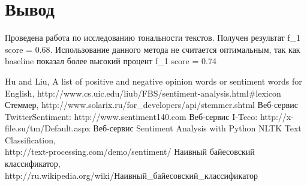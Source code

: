\documentclass[14pt,a4paper]{scrartcl}
\begin{document}
\newpage
\section{Вывод}

Проведена работа по исследованию тональности текстов. Получен результат f\_1 score = 0.68. Использование данного метода не считается оптимальным, так как baseline показал более высокий процент f\_1 score = 0.74

\newpage
\begin{thebibliography}{0}
 Hu and Liu, A list of positive and negative opinion words or sentiment words for English, http://www.cs.uic.edu/liub/FBS/sentiment-analysis.html\#lexicon
 Стеммер, http://www.solarix.ru/for\_developers/api/stemmer.shtml
 Веб-сервис TwitterSentiment: http://www.sentiment140.com
 Веб-сервис I‐Teco: http://x-file.su/tm/Default.aspx
 Веб-сервис Sentiment Analysis with Python NLTK Text Classification,\\ http://text-processing.com/demo/sentiment/
 Наивный	байесовский	классификатор,\\ http://ru.wikipedia.org/wiki/Наивный\_байесовский\_классификатор
\end{thebibliography}
\end{document}
